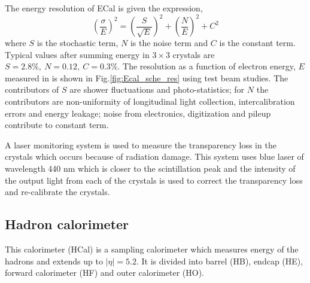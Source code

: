\noindent The energy resolution of ECal is given the expression,
\begin{equation}
\label{eqn:ecalReso}
{\left(\frac{\sigma}{E}\right)}^2  =  {\left(\frac{S}{\sqrt{E}}\right)}^2 + {\left(\frac{N}{E}\right)}^2 + C^2
\end{equation}
where $S$ is the stochastic term, $N$ is the noise term and $C$ is the constant term. Typical values after summing energy in $3\times3$ crystals are $S=2.8\%,\ N=0.12,\ C=0.3\%$. The resolution as a function of electron energy, $E$ measured in \gev is shown in Fig.\ref{fig:Ecal_sche_res} using test beam studies. The contributors of $S$ are shower fluctuations and photo-statistics; for $N$ the contributors are non-uniformity of longitudinal light collection, intercalibration errors and energy leakage; noise from electronics, digitization and pileup contribute to constant term.

A laser monitoring system is used to measure the transparency loss in the crystals which occurs because of radiation damage. This system uses blue laser of wavelength 440 nm which is closer to the scintillation peak and the intensity of the output light from each of the crystals is used to correct the transparency loss and re-calibrate the crystals.

\subsection{Hadron calorimeter}
This calorimeter (HCal) is a sampling calorimeter which measures energy of the hadrons and extends up to $|\eta| = 5.2$. It is divided into barrel (HB), endcap (HE), forward calorimeter (HF) and outer calorimeter (HO). 

